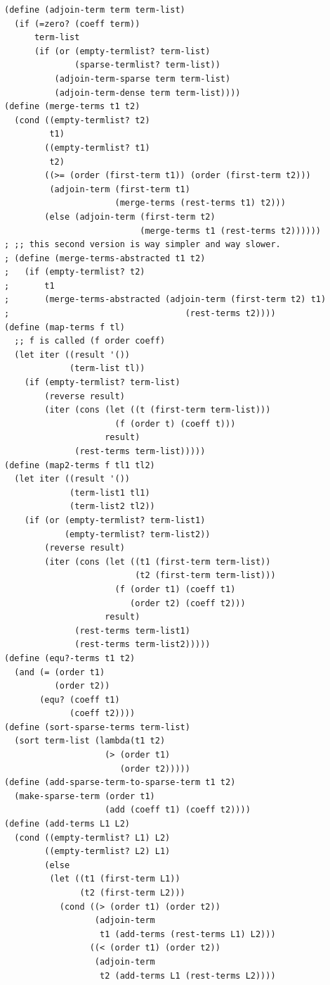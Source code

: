 \documentclass[final,fleqn,titlepage,twoside]{article}
\begin{document}
\begin{verbatim}
(define (adjoin-term term term-list)
  (if (=zero? (coeff term))
      term-list
      (if (or (empty-termlist? term-list)
              (sparse-termlist? term-list))
          (adjoin-term-sparse term term-list)
          (adjoin-term-dense term term-list))))
(define (merge-terms t1 t2)
  (cond ((empty-termlist? t2)
         t1)
        ((empty-termlist? t1)
         t2)
        ((>= (order (first-term t1)) (order (first-term t2)))
         (adjoin-term (first-term t1)
                      (merge-terms (rest-terms t1) t2)))
        (else (adjoin-term (first-term t2)
                           (merge-terms t1 (rest-terms t2))))))
; ;; this second version is way simpler and way slower.
; (define (merge-terms-abstracted t1 t2)
;   (if (empty-termlist? t2)
;       t1
;       (merge-terms-abstracted (adjoin-term (first-term t2) t1)
;                                   (rest-terms t2))))
(define (map-terms f tl)
  ;; f is called (f order coeff)
  (let iter ((result '())
             (term-list tl))
    (if (empty-termlist? term-list)
        (reverse result)
        (iter (cons (let ((t (first-term term-list)))
                      (f (order t) (coeff t)))
                    result)
              (rest-terms term-list)))))
(define (map2-terms f tl1 tl2)
  (let iter ((result '())
             (term-list1 tl1)
             (term-list2 tl2))
    (if (or (empty-termlist? term-list1)
            (empty-termlist? term-list2))
        (reverse result)
        (iter (cons (let ((t1 (first-term term-list))
                          (t2 (first-term term-list)))
                      (f (order t1) (coeff t1)
                         (order t2) (coeff t2)))
                    result)
              (rest-terms term-list1)
              (rest-terms term-list2)))))
(define (equ?-terms t1 t2)
  (and (= (order t1)
          (order t2))
       (equ? (coeff t1)
             (coeff t2))))
(define (sort-sparse-terms term-list)
  (sort term-list (lambda(t1 t2)
                    (> (order t1)
                       (order t2)))))
(define (add-sparse-term-to-sparse-term t1 t2)
  (make-sparse-term (order t1)
                    (add (coeff t1) (coeff t2))))
(define (add-terms L1 L2)
  (cond ((empty-termlist? L1) L2)
        ((empty-termlist? L2) L1)
        (else
         (let ((t1 (first-term L1))
               (t2 (first-term L2)))
           (cond ((> (order t1) (order t2))
                  (adjoin-term
                   t1 (add-terms (rest-terms L1) L2)))
                 ((< (order t1) (order t2))
                  (adjoin-term
                   t2 (add-terms L1 (rest-terms L2))))

\end{verbatim}
\end{document}
